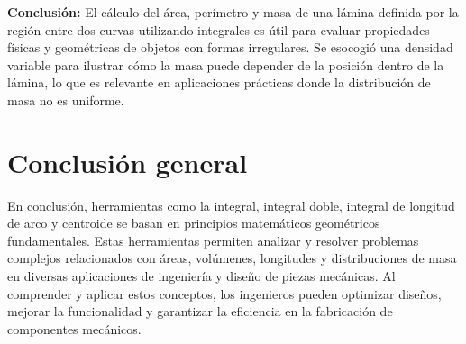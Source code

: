 \textbf{Conclusión:} El cálculo del área, perímetro y masa de una lámina definida por la región entre dos curvas utilizando integrales es útil para evaluar propiedades físicas y geométricas de objetos con formas irregulares. Se esocogió una densidad variable para ilustrar cómo la masa puede depender de la posición dentro de la lámina, lo que es relevante en aplicaciones prácticas donde la distribución de masa no es uniforme.

\section{Conclusión general}

En conclusión, herramientas como la integral, integral doble, integral de longitud de arco y centroide se basan en principios matemáticos geométricos fundamentales. Estas herramientas permiten analizar y resolver problemas complejos relacionados con áreas, volúmenes, longitudes y distribuciones de masa en diversas aplicaciones de ingeniería y diseño de piezas mecánicas. Al comprender y aplicar estos conceptos, los ingenieros pueden optimizar diseños, mejorar la funcionalidad y garantizar la eficiencia en la fabricación de componentes mecánicos.
